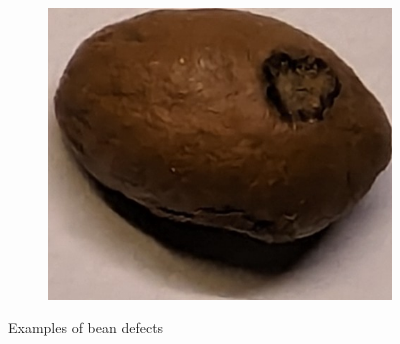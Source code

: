 \begin{figure}[h]
\begin{subfigure}
{            ./figures/methodology/insect-damaged-bean
        }
         \label{fig:insectBeanSingle}
    \end{subfigure}
    \begin{subfigure}
    {0.25\textwidth}
        \includegraphics[height=0.8\linewidth, keepaspectratio]{
            ./figures/methodology/mold-damaged-bean
        }
         \label{fig:moldBeanSingle}
    \end{subfigure}
    \caption{Examples of bean defects}
    \label{fig:beanDefects}
\end{figure}

